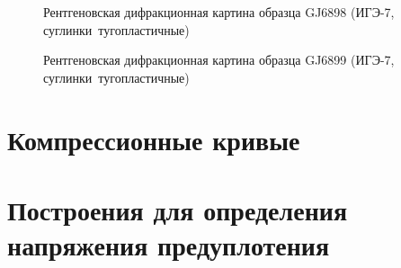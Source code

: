   \begin{figure}[ht]
    \caption{Рентгеновская дифракционная картина образца GJ6898 (ИГЭ-7, суглинки тугопластичные)}\label{fig:fig}
  \end{figure}

  \begin{figure}[ht]
    \caption{Рентгеновская дифракционная картина образца GJ6899 (ИГЭ-7, суглинки тугопластичные)}\label{fig:fig}
  \end{figure}

\chapter{Компрессионные кривые}\label{app:oedometer}


\chapter{Построения для определения напряжения предуплотения}\label{app:method}
